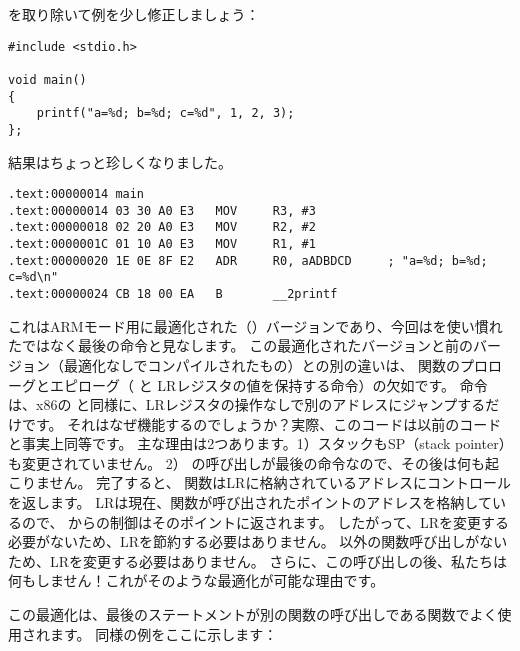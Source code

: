 を取り除いて例を少し修正しましょう：

\begin{lstlisting}[style=customc]
#include <stdio.h>

void main()
{
	printf("a=%d; b=%d; c=%d", 1, 2, 3);
};
\end{lstlisting}

結果はちょっと珍しくなりました。

\begin{lstlisting}[caption=\OptimizingKeilVI (\ARMMode),style=customasmARM]
.text:00000014 main
.text:00000014 03 30 A0 E3   MOV     R3, #3
.text:00000018 02 20 A0 E3   MOV     R2, #2
.text:0000001C 01 10 A0 E3   MOV     R1, #1
.text:00000020 1E 0E 8F E2   ADR     R0, aADBDCD     ; "a=%d; b=%d; c=%d\n"
.text:00000024 CB 18 00 EA   B       __2printf
\end{lstlisting}

これはARMモード用に最適化された（\Othree）バージョンであり、今回はを使い慣れたではなく最後の命令と見なします。
この最適化されたバージョンと前のバージョン（最適化なしでコンパイルされたもの）との別の違いは、
関数のプロローグとエピローグ（ と \ac{LR}レジスタの値を保持する命令）の欠如です。 
命令は、x86の \JMP と同様に、\ac{LR}レジスタの操作なしで別のアドレスにジャンプするだけです。
それはなぜ機能するのでしょうか？実際、このコードは以前のコードと事実上同等です。
主な理由は2つあります。1）スタックも\ac{SP}（\gls{stack pointer}）も変更されていません。 
2） \printf の呼び出しが最後の命令なので、その後は何も起こりません。
完了すると、 \printf 関数は\ac{LR}に格納されているアドレスにコントロールを返します。 
\ac{LR}は現在、関数が呼び出されたポイントのアドレスを格納しているので、 \printf からの制御はそのポイントに返されます。
したがって、\ac{LR}を変更する必要がないため、\ac{LR}を節約する必要はありません。 
\printf 以外の関数呼び出しがないため、\ac{LR}を変更する必要はありません。
さらに、この呼び出しの後、私たちは何もしません！これがそのような最適化が可能な理由です。

この最適化は、最後のステートメントが別の関数の呼び出しである関数でよく使用されます。
同様の例をここに示します：





